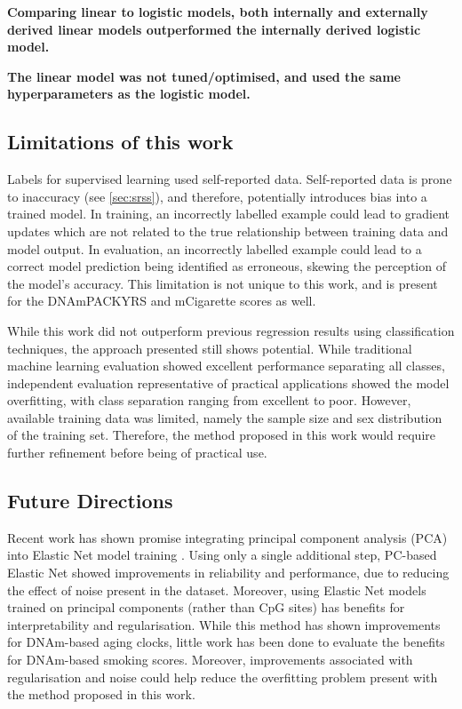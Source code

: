 \documentclass{article} %
\begin{document}
\textbf{Comparing linear to logistic models, both internally and externally derived linear models outperformed the internally derived logistic model.}

\textbf{The linear model was not tuned/optimised, and used the same hyperparameters as the logistic model.}

\subsection{Limitations of this work} \label{sec:limitations}
Labels for supervised learning used self-reported data. Self-reported data is prone to inaccuracy (see
\ref{sec:srss}), and therefore, potentially introduces bias into a trained model. In training, an incorrectly labelled example could lead to gradient updates which are not related to the true relationship between training data and model output. In evaluation, an incorrectly labelled example could lead to a correct model prediction being identified as erroneous, skewing the perception of the model's accuracy. This limitation is not unique to this work, and is present for the DNAmPACKYRS and mCigarette scores as well.

While this work did not outperform previous regression results using classification techniques, the approach presented still shows potential. While traditional machine learning evaluation showed excellent performance separating all classes, independent evaluation representative of practical applications showed the model overfitting, with class separation ranging from excellent to poor. However, available training data was limited, namely the sample size and sex distribution of the training set. Therefore, the method proposed in this work would require further refinement before being of practical use.

\subsection{Future Directions}
Recent work has shown promise integrating principal component analysis (PCA) into Elastic Net model training \cite{higgins2022computational}. Using only a single additional step, PC-based Elastic Net showed improvements in reliability and performance, due to reducing the effect of noise present in the dataset. Moreover, using Elastic Net models trained on principal components (rather than CpG sites) has benefits for interpretability and regularisation. While this method has shown improvements for DNAm-based aging clocks, little work has been done to evaluate the benefits for DNAm-based smoking scores. Moreover, improvements associated with regularisation and noise could help reduce the overfitting problem present with the method proposed in this work.
\end{document}
